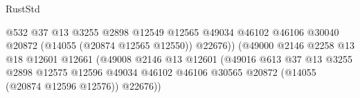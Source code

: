 \begin{lexlean}{RustStd}
\begin{coremodule}
                                                          @532
                                                          @37
                                                          @13
                                                          @3255
                                                          @2898
                                                          @12549
                                                          @12565
                                                          @49034
                                                          @46102
                                                          @46106
                                                          @30040
                                                          @20872
                                                          (@14055 (@20874 @12565 @12550))
                                                          @22676))
                                                      (@49000
                                                        @2146
                                                        @2258
                                                        @13
                                                        @18
                                                        @12601
                                                        @12661
                                                        (@49008
                                                          @2146
                                                          @13
                                                          @12601
                                                          (@49016
                                                            @613
                                                            @37
                                                            @13
                                                            @3255
                                                            @2898
                                                            @12575
                                                            @12596
                                                            @49034
                                                            @46102
                                                            @46106
                                                            @30565
                                                            @20872
                                                            (@14055 (@20874 @12596 @12576))
                                                            @22676))

\end{coremodule}
\end{lexlean}
